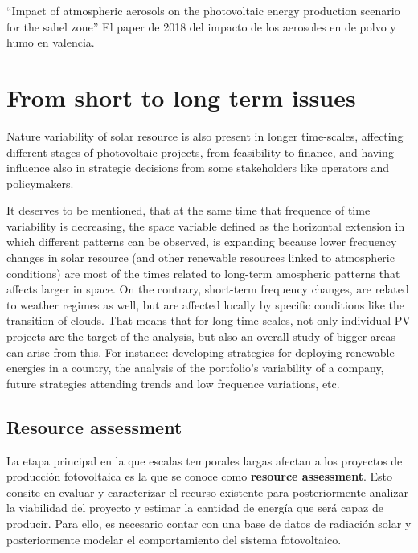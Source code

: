 ``Impact of atmospheric aerosols on the photovoltaic energy production scenario for the sahel zone''
El paper de 2018 del impacto de los aerosoles en de polvo y humo en valencia.

\section{From short to long term issues}%

Nature variability of solar resource is also present in longer time-scales, affecting different stages of photovoltaic projects, from feasibility to finance, and having influence also in strategic decisions from some stakeholders like operators and policymakers.

It deserves to be mentioned, that at the same time that frequence of time variability is decreasing, the space variable defined as the horizontal extension in which different patterns can be observed, is expanding because lower frequency changes in solar resource (and other renewable resources linked to atmospheric conditions) are most of the times related to long-term amospheric patterns that affects larger in space. On the contrary, short-term frequency changes, are related to weather regimes as well, but are affected locally by specific conditions like the transition of clouds. That means that for long time scales, not only individual PV projects are the target of the analysis, but also an overall study of bigger areas can arise from this. For instance: developing strategies for deploying renewable energies in a country, the analysis of the portfolio's variability of a company, future strategies attending trends and low frequence variations, etc. 

\subsection{Resource assessment}

La etapa principal en la que escalas temporales largas afectan a los proyectos de producción fotovoltaica es la que se conoce como \textbf{resource assessment}. Esto consite en evaluar y caracterizar el recurso existente para posteriormente analizar la viabilidad del proyecto y estimar la cantidad de energía que será capaz de producir. Para ello, es necesario contar con una base de datos de radiación solar y posteriormente modelar el comportamiento del sistema fotovoltaico.

